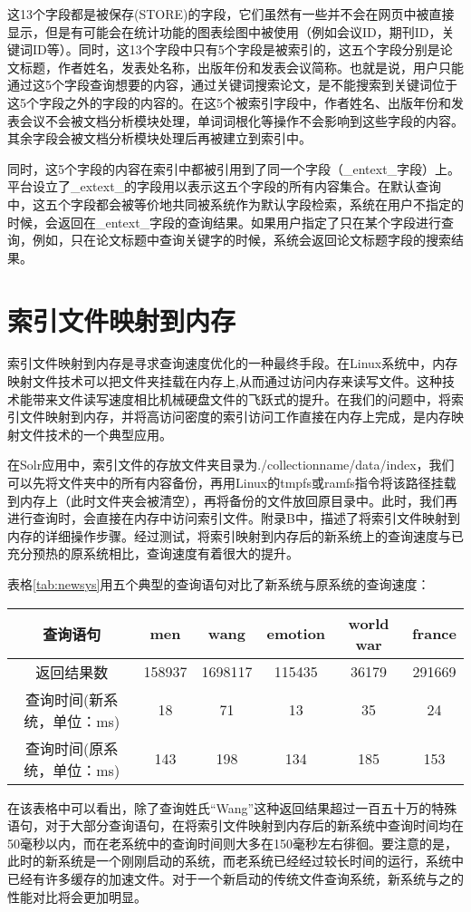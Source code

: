     这13个字段都是被保存(STORE)的字段，它们虽然有一些并不会在网页中被直接显示，但是有可能会在统计功能的图表绘图中被使用（例如会议ID，期刊ID，关键词ID等）。同时，这13个字段中只有5个字段是被索引的，这五个字段分别是论文标题，作者姓名，发表处名称，出版年份和发表会议简称。也就是说，用户只能通过这5个字段查询想要的内容，通过关键词搜索论文，是不能搜索到关键词位于这5个字段之外的字段的内容的。在这5个被索引字段中，作者姓名、出版年份和发表会议不会被文档分析模块处理，单词词根化等操作不会影响到这些字段的内容。其余字段会被文档分析模块处理后再被建立到索引中。

    同时，这5个字段的内容在索引中都被引用到了同一个字段（\_entext\_字段）上。平台设立了\_extext\_的字段用以表示这五个字段的所有内容集合。在默认查询中，这五个字段都会被等价地共同被系统作为默认字段检索，系统在用户不指定的时候，会返回在\_entext\_字段的查询结果。如果用户指定了只在某个字段进行查询，例如，只在论文标题中查询关键字的时候，系统会返回论文标题字段的搜索结果。

\section{索引文件映射到内存}
    索引文件映射到内存是寻求查询速度优化的一种最终手段。在Linux系统中，内存映射文件技术可以把文件夹挂载在内存上,从而通过访问内存来读写文件。这种技术能带来文件读写速度相比机械硬盘文件的飞跃式的提升。在我们的问题中，将索引文件映射到内存，并将高访问密度的索引访问工作直接在内存上完成，是内存映射文件技术的一个典型应用。

    在Solr应用中，索引文件的存放文件夹目录为./collectionname/data/index，我们可以先将文件夹中的所有内容备份，再用Linux的tmpfs或ramfs指令将该路径挂载到内存上（此时文件夹会被清空），再将备份的文件放回原目录中。此时，我们再进行查询时，会直接在内存中访问索引文件。附录B中，描述了将索引文件映射到内存的详细操作步骤。经过测试，将索引映射到内存后的新系统上的查询速度与已充分预热的原系统相比，查询速度有着很大的提升。

    表格\ref{tab:newsys}用五个典型的查询语句对比了新系统与原系统的查询速度：

    \begin{table}[!htpb]
    \centering
        \begin{tabular}{|c|c|c|c|c|c|}
        \hline
        查询语句 & men & wang & emotion & world war & france\\
        \hline
        返回结果数 & 158937 & 1698117 & 115435 & 36179 & 291669\\
        \hline
        查询时间(新系统，单位：ms) & 18 & 71 & 13 & 35 & 24\\
        \hline
        查询时间(原系统，单位：ms) & 143 & 198 & 134 & 185 & 153\\
        \hline
        \end{tabular}
    \end{table}
    在该表格中可以看出，除了查询姓氏“Wang”这种返回结果超过一百五十万的特殊语句，对于大部分查询语句，在将索引文件映射到内存后的新系统中查询时间均在50毫秒以内，而在老系统中的查询时间则大多在150毫秒左右徘徊。要注意的是，此时的新系统是一个刚刚启动的系统，而老系统已经经过较长时间的运行，系统中已经有许多缓存的加速文件。对于一个新启动的传统文件查询系统，新系统与之的性能对比将会更加明显。